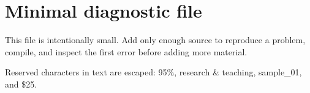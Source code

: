 \documentclass{article}
\begin{document}
\section{Minimal diagnostic file}
This file is intentionally small. Add only enough source to reproduce a
problem, compile, and inspect the first error before adding more material.

Reserved characters in text are escaped: 95\%, research \& teaching,
sample\_01, and \$25.
\end{document}
